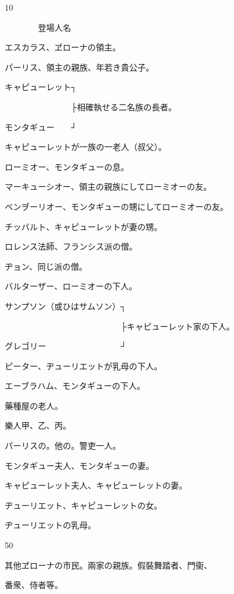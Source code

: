 \documentclass[tate,paper=b6j,jafontsize=9pt]{jlreq}
\begin{document}
\thispagestyle{empty}
\vspace*{\fill}
\zw
{}
\vfill
\newpage

\begin{azconvIndented}{1\zw}{0\zw}

　　　　登場人名


エスカラス、ヹローナの領主。

パーリス、領主の親族、年若き貴公子。

キャピューレット┐

　　　　　　　　├相確執せる二名族の長者。

モンタギュー　　┘

キャピューレットが一族の一老人（叔父）。

ローミオー、モンタギューの息。

マーキューシオー、領主の親族にしてローミオーの友。

ベンヺーリオー、モンタギューの甥にしてローミオーの友。

チッバルト、キャピューレットが妻の甥。

ロレンス法師、フランシス派の僧。

ヂョン、同じ派の僧。

バルターザー、ローミオーの下人。

サンプソン（或ひはサムソン）┐

　　　　　　　　　　　　　　├キャピューレット家の下人。

グレゴリー　　　　　　　　　┘

ピーター、ヂューリエットが乳母の下人。

エーブラハム、モンタギューの下人。

藥種屋の老人。

樂人甲、乙、丙。

パーリスの。他の。警吏一人。

モンタギュー夫人、モンタギューの妻。

キャピューレット夫人、キャピューレットの妻。

ヂューリエット、キャピューレットの女。

ヂューリエットの乳母。


\end{azconvIndented}
\begin{azconvIndented}{5\zw}{0\zw}

其他ヹローナの市民。兩家の親族。假裝舞踏者、門衞、

番衆、侍者等。

\end{azconvIndented}
\end{document}
